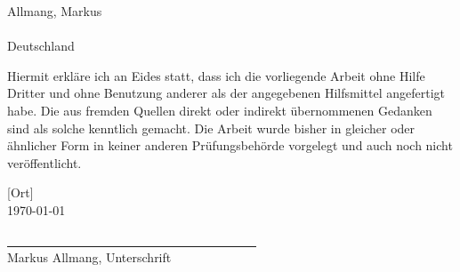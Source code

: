 \newpage



\text{ }
\vspace{2.0cm}

Allmang, Markus\\
[Straße, PLZ Ort]\\
Deutschland
\vspace{1.0cm}

\glqq Hiermit erkl\"are ich an Eides statt, dass ich die vorliegende Arbeit ohne Hilfe Dritter und ohne
Benutzung anderer als der angegebenen Hilfsmittel angefertigt habe. Die aus fremden Quellen
direkt oder indirekt \"ubernommenen Gedanken sind als solche kenntlich gemacht. Die Arbeit
wurde bisher in gleicher oder \"ahnlicher Form in keiner anderen Pr\"ufungsbeh\"orde vorgelegt
und auch noch nicht ver\"offentlicht.\grqq

[Ort]\\
\today
\medskip
\medskip

\underline{~~~~~~~~~~~~~~~~~~~~~~~~~~~~~~~~~~~~~~~~}\\
Markus Allmang, Unterschrift



\newpage

\setcounter{page}{3}
